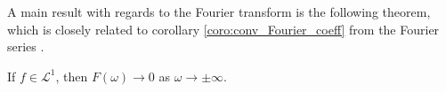 A main result with regards to the Fourier transform is the following theorem, which is closely related to corollary \ref{coro:conv_Fourier_coeff} from the Fourier series \cite{page 217, FAA}.

\begin{theorem}
If $f \in \mathcal{L}^1$, then $F(\omega) \to 0$ as $\omega \to \pm \infty$.
\end{theorem}

